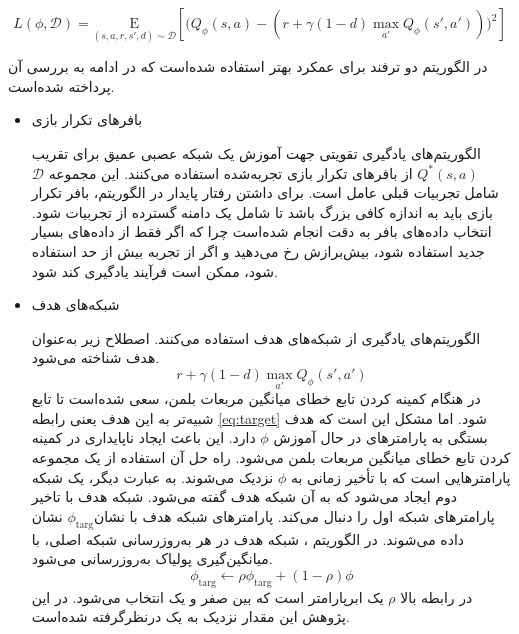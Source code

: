           \begin{equation}
          	L(\phi, {\mathcal D}) = \underset{(s,a,r,s',d) \sim {\mathcal D}}{{\mathrm E}}\left[
          	\Bigg( Q_{\phi}(s,a) - \left(r + \gamma (1 - d) \max_{a'} Q_{\phi}(s',a') \right) \Bigg)^2
          	\right]
          \end{equation}
          
          
          
          
          در الگوریتم  دو ترفند برای عمکرد بهتر استفاده شده‌است که در ادامه به بررسی آن پرداخته شده‌است.
          \begin{itemize}
          	\item بافرهای تکرار بازی
          	
          	 الگوریتم‌های یادگیری تقویتی جهت آموزش یک شبکه عصبی عمیق برای تقریب 
          	 $Q^*(s,a)$
          	  از  بافرهای تکرار بازی
          	   تجربه‌شده استفاده می‌کنند. 
          	           این مجموعه 
          	   ${\mathcal D}$
          	   شامل تجربیات قبلی عامل است. برای داشتن رفتار پایدار در الگوریتم، بافر تکرار بازی باید به اندازه کافی بزرگ باشد تا شامل یک دامنه گسترده از تجربیات شود. انتخاب داده‌های بافر به دقت انجام شده‌است چرا که اگر فقط از داده‌های بسیار جدید استفاده شود، بیش‌برازش
          	   رخ می‌دهید و اگر از تجربه بیش از حد استفاده شود، ممکن است فرآیند یادگیری کند شود.
          	\item شبکه‌های هدف
          	
          	الگوریتم‌های یادگیری  از شبکه‌های هدف استفاده می‌کنند. اصطلاح زیر به‌عنوان هدف شناخته می‌شود.
          	\begin{equation}\label{eq:target}
          		r + \gamma (1 - d) \max_{a'} Q_{\phi}(s',a')
          	\end{equation}
          	در هنگام کمینه کردن تابع خطای میانگین مربعات بلمن، سعی شده‌است تا تابع  شبیه‌تر به این هدف یعنی رابطه \eqref{eq:target} شود. اما مشکل این است که هدف بستگی به پارامترهای در حال آموزش $\phi$ دارد.
 این باعث ایجاد ناپایداری در کمینه کردن تابع خطای میانگین مربعات بلمن می‌شود. راه حل آن استفاده از یک مجموعه پارامترهایی است که با تأخیر زمانی به 
          	$\phi$
          	 نزدیک می‌شوند. به عبارت دیگر، یک شبکه دوم  ایجاد می‌شود که به آن شبکه هدف گفته می‌شود. شبکه هدف 
          	 با تاخیر پارامترهای شبکه اول را دنبال می‌کند. پارامترهای شبکه هدف با نشان 
          	​$\phi_{\text{targ}}$
          	نشان داده می‌شوند.
          	در الگوریتم ، شبکه هدف در هر به‌روزرسانی شبکه اصلی، با میانگین‌گیری پولیاک
          	 به‌روزرسانی می‌شود.
          	 \begin{equation}
          	 	\phi_{\text{targ}} \leftarrow \rho \phi_{\text{targ}} + (1 - \rho) \phi
          	 \end{equation}
          	 در رابطه بالا $\rho$ یک ابرپارامتر است که بین صفر و یک انتخاب می‌شود. در این پژوهش این مقدار نزدیک به یک درنظرگرفته شده‌است.
          \end{itemize}
          
